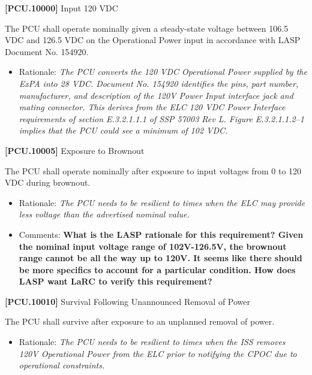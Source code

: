 \textbf{[PCU.10000]} Input 120 \gls{VDC}

The \gls{PCU} shall operate nominally given a steady-state voltage between 106.5 \gls{VDC} and 126.5 \gls{VDC} on the Operational Power input in accordance with \gls{LASP} Document No. 154920.

\begin{itemize}
\item{} Rationale: \emph{The PCU converts the 120 VDC Operational Power supplied by the ExPA into 28 VDC. Document No. 154920 identifies the pins, part number, manufacturer, and description of the 120V Power Input interface jack and mating connector. This derives from the ELC 120 VDC Power Interface requirements of section E.3.2.1.1.1 of SSP 57003 Rev L. Figure E.3.2.1.1.2--1 implies that the PCU could see a minimum of 102 VDC.}

\end{itemize}

\textbf{[PCU.10005]} Exposure to Brownout

The \gls{PCU} shall operate nominally after exposure to input voltages from 0 to 120 \gls{VDC} during brownout.

\begin{itemize}
\item{} Rationale: \emph{The PCU needs to be resilient to times when the ELC may provide less voltage than the advertised nominal value.}

\item{} Comments: \textbf{What is the LASP rationale for this requirement? Given the nominal input voltage range of 102V-126.5V, the brownout range cannot be all the way up to 120V. It seems like there should be more specifics to account for a particular condition. How does LASP want LaRC to verify this requirement?}

\end{itemize}

\textbf{[PCU.10010]} Survival Following Unannounced Removal of Power

The \gls{PCU} shall survive after exposure to an unplanned removal of power.

\begin{itemize}
\item{} Rationale: \emph{The PCU needs to be resilient to times when the ISS removes 120V Operational Power from the ELC prior to notifying the CPOC due to operational constraints.}

\end{itemize}

